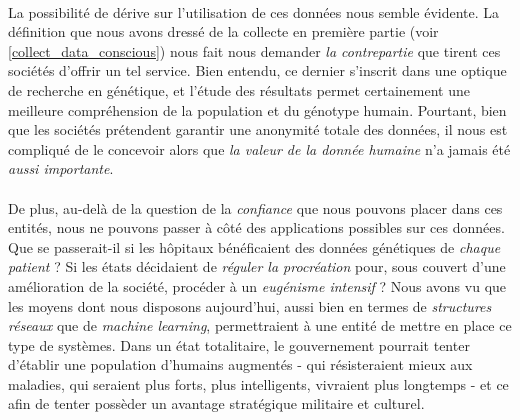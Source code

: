 \paragraph{} La possibilité de dérive sur l'utilisation de ces données nous semble évidente. La définition
que nous avons dressé de la collecte en première partie (voir \ref{collect_data_conscious}) nous fait nous 
demander \emph{la contrepartie} que tirent ces sociétés d'offrir un tel service. Bien entendu, ce dernier 
s'inscrit dans une optique de recherche en génétique, et l'étude des résultats permet certainement une
meilleure compréhension de la population et du génotype humain. Pourtant, bien que les sociétés prétendent
garantir une anonymité totale des données, il nous est compliqué de le concevoir alors que \emph{la valeur
de la donnée humaine} n'a jamais été \emph{aussi importante}. 

\paragraph{} De plus, au-delà de la question de la \emph{confiance} que nous pouvons placer dans ces entités,
nous ne pouvons passer à côté des applications possibles sur ces données. Que se passerait-il si les hôpitaux
bénéficaient des données génétiques de \emph{chaque patient} ? Si les états décidaient de \emph{réguler la
procréation} pour, sous couvert d'une amélioration de la société, procéder à un \emph{eugénisme intensif} ?
Nous avons vu que les moyens dont nous disposons aujourd'hui, aussi bien en termes de \emph{structures réseaux}
que de \emph{machine learning}, permettraient à une entité de mettre en place ce type de systèmes. Dans un état
totalitaire, le gouvernement pourrait tenter d'établir une population d'humains augmentés - qui résisteraient mieux 
aux maladies, qui seraient plus forts, plus intelligents, vivraient plus longtemps - et ce afin de tenter possèder
un avantage stratégique militaire et culturel.

